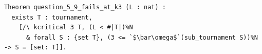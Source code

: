 \begin{lstlisting}[language=Rocq]
Theorem question_5_9_fails_at_k3 (L : nat) :
  exists T : tournament,
    [/\ kcritical 3 T, (L < #|T|)%N
      & forall S : {set T}, (3 <= `$\bar\omega$`(sub_tournament S))%N -> S = [set: T]].
\end{lstlisting}
